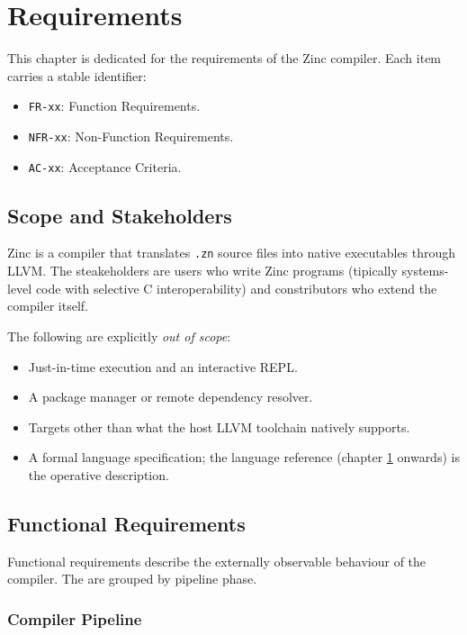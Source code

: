 \chapter{Requirements}
\label{ch:requirements}

This chapter is dedicated for the requirements of the Zinc compiler.
Each item carries a stable identifier:
\begin{itemize}
    \item \texttt{FR-xx}: Function Requirements.
    \item \texttt{NFR-xx}: Non-Function Requirements.
    \item \texttt{AC-xx}: Acceptance Criteria.
\end{itemize}

\section{Scope and Stakeholders}

Zinc is a compiler that translates \texttt{.zn} source files into native executables through LLVM. The steakeholders are users who write Zinc programs (tipically systems-level code with selective C interoperability) and constributors who extend the compiler itself.

The following are explicitly \emph{out of scope}:

\begin{itemize}
    \item Just-in-time execution and an interactive REPL.
    \item A package manager or remote dependency resolver.
    \item Targets other than what the host LLVM toolchain natively supports.
    \item A formal language specification; the language reference (chapter \ref{ch:requirements} onwards) is the operative description.
\end{itemize}

\section{Functional Requirements}
\label{sec:functional_requirements}

Functional requirements describe the externally observable behaviour of the compiler. The are grouped by pipeline phase.

\subsection{Compiler Pipeline}

